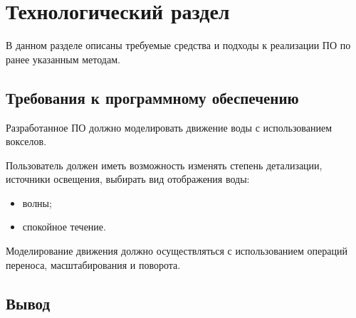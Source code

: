 \chapter{Технологический раздел}
\label{cha:impl}

В данном разделе описаны требуемые средства и подходы к реализации ПО по ранее указанным методам.


\section{Требования к программному обеспечению}

Разработанное ПО должно моделировать движение воды с использованием вокселов.

Пользователь должен иметь возможность изменять степень детализации,
источники освещения, выбирать вид отображения воды:
\begin{itemize}
    \item волны;
    \item спокойное течение.
\end{itemize}

Моделирование движения должно осуществляться с использованием операций переноса, масштабирования и поворота.

\section{Вывод}

